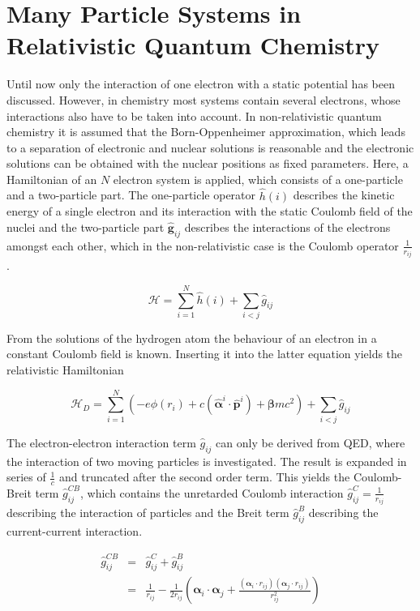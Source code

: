 \section{Many Particle Systems in Relativistic Quantum Chemistry}
Until now only the interaction of one electron with a static potential has been
discussed. However, in chemistry most systems contain several electrons, whose
interactions also have to be taken into account.
In non-relativistic quantum chemistry it is assumed that the Born-Oppenheimer
approximation, which leads to a separation of electronic and nuclear solutions
is reasonable and the electronic solutions can be obtained with the
nuclear positions as fixed parameters.
Here, a Hamiltonian of an $N$ electron system is applied, which consists
of a one-particle and a two-particle part. The one-particle operator $\hat{h}(i)$
describes the kinetic energy of a single electron and its interaction with the
static Coulomb field of the nuclei and the two-particle part $\mathbf{\hat{g}}_{ij}$
describes the interactions of the electrons amongst each other, which in the
non-relativistic case is the Coulomb operator $\frac1{r_{ij}}$.

\begin{equation}
\mathcal{H}= \sum\limits_{i=1}^N \hat{h}(i) + \sum\limits_{i<j} {\hat{g}}_{ij}
\end{equation}

From the solutions of the hydrogen atom the behaviour of an electron in a constant
Coulomb field is known. Inserting it into the latter equation yields the
relativistic Hamiltonian

\begin{equation}
\mathcal{H}_{D}= \sum\limits_{i=1}^N (-e \phi(r_i)+
                 c(\hat{\boldsymbol{\alpha}}^{i}\cdot\hat{\mathbf{p}}^{i})
                 +\boldsymbol{\beta}mc^2)
                 + \sum\limits_{i<j} {\hat{g}}_{ij}
\end{equation}

The electron-electron interaction term ${\hat{g}}_{ij}$ can only be derived
from \ac{QED}, where the interaction of two moving particles is investigated.
The result is expanded in series of $\frac1c$ and truncated after the second
order term. This yields the Coulomb-Breit term $\hat{g}_{ij}^{CB}$, which
contains the unretarded Coulomb interaction $\hat{g}_{ij}^C=\frac1{r_{ij}}$
describing the interaction of particles and
the Breit term $\hat{g}_{ij}^B$ describing the current-current interaction.

\begin{equation}\begin{array}{rcl}
\hat{g}_{ij}^{CB} &=& \hat{g}_{ij}^C + \hat{g}_{ij}^B\\
                &=& \frac1{r_{ij}} - \frac1{2r_{ij}}\left(\boldsymbol{\alpha}_i
                    \cdot\boldsymbol{\alpha}_j+\frac{(\boldsymbol{\alpha}_i
                    \cdot r_{ij})(\boldsymbol{\alpha}_j\cdot r_{ij})}
                    {r^2_{ij}}\right)
\end{array}\end{equation}

